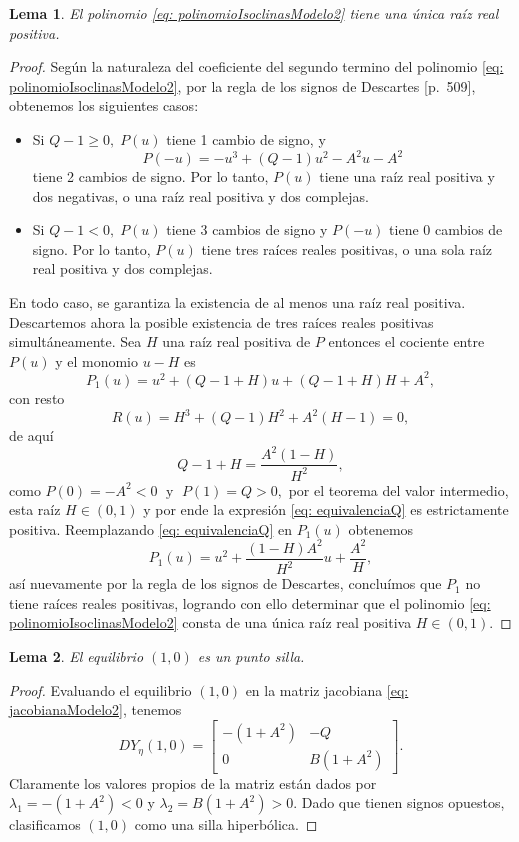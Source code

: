 \documentclass[]{article}
\newtheorem{lemma}{Lema}[section]
\theoremstyle{remark}
\begin{document}
	\begin{lemma}
		El polinomio \eqref{eq: polinomioIsoclinasModelo2} tiene una única raíz real positiva.
		\label{lem: polinomio}
	\end{lemma}
	\begin{proof}
		Según la naturaleza del coeficiente del segundo termino del polinomio \eqref{eq: polinomioIsoclinasModelo2}, por la regla de los signos de Descartes \cite{murray}[p.~509], obtenemos los siguientes casos: 
		\begin{itemize}
			\item Si $Q-1 \geq 0, \; P(u)$ tiene 1 cambio de signo, y $$P(-u)=-u^{3}+(Q-1)u^{2}-A^{2}u-A^{2}$$ tiene 2 cambios de signo. Por lo tanto, $P(u)$ tiene una raíz real positiva y dos negativas, o una raíz real positiva y dos complejas.
			\item Si $Q-1<0, \; P(u)$ tiene 3 cambios de signo y $P(-u)$ tiene 0 cambios de signo. Por lo tanto, $P(u)$ tiene tres raíces reales positivas, o una sola raíz real positiva y dos complejas.
		\end{itemize}
		En todo caso, se garantiza la existencia de al menos una raíz real positiva. Descartemos ahora la posible existencia de tres raíces reales positivas simultáneamente. Sea $H$ una raíz real positiva de $P$ entonces el cociente entre $P(u)$ y el monomio $u - H$ es $$P_{1}(u) = u^{2}+(Q-1+H)u+(Q-1+H)H+A^{2},$$ con resto $$R(u) = H^{3}+(Q-1)H^{2}+A^{2}(H-1) = 0,$$ de aquí 
		\begin{equation}
			Q-1+H = \dfrac{A^{2}(1-H)}{H^{2}},
			\label{eq: equivalenciaQ}
		\end{equation}
		como $P(0) = -A^{2}<0 \; \text{ y } \; P(1) = Q>0,$ por el teorema del valor intermedio, esta raíz $H \in (0,1)$ y por ende la expresión \eqref{eq: equivalenciaQ} es estrictamente positiva. Reemplazando \eqref{eq: equivalenciaQ} en $P_{1}(u)$ obtenemos $$P_{1}(u) = u^{2}+\dfrac{(1-H)A^{2}}{H^{2}}u+\dfrac{A^{2}}{H},$$ así nuevamente por la regla de los signos de Descartes, concluímos que $P_{1}$ no tiene raíces reales positivas, logrando con ello determinar que el polinomio \eqref{eq: polinomioIsoclinasModelo2} consta de una única raíz real positiva $H \in (0,1)$.
	\end{proof}
	
	\begin{lemma}
		El equilibrio $(1,0)$ es un punto silla.
	\end{lemma}
	\begin{proof}
		Evaluando el equilibrio $(1,0)$ en la matriz jacobiana \eqref{eq: jacobianaModelo2}, tenemos
		\begin{equation*}
			DY_\eta(1,0) =
			\begin{bmatrix}
				-(1+A^{2}) & -Q \\
				0 & B(1+A^{2})
			\end{bmatrix}.
		\end{equation*}
		Claramente los valores propios de la matriz están dados por $\lambda_1 = -(1+A^{2}) < 0$ y $\lambda_2 = B(1+A^{2}) > 0$. Dado que tienen signos opuestos, clasificamos $(1,0)$ como una silla hiperbólica.
	\end{proof}
	
\end{document}
